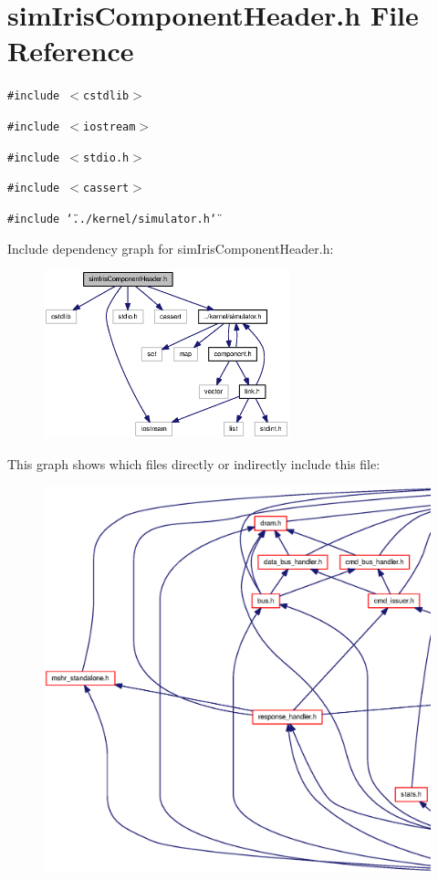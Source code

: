 \section{simIrisComponentHeader.h File Reference}
\label{simIrisComponentHeader_8h}
{\tt \#include $<$cstdlib$>$}\par
{\tt \#include $<$iostream$>$}\par
{\tt \#include $<$stdio.h$>$}\par
{\tt \#include $<$cassert$>$}\par
{\tt \#include \char`\"{}../kernel/simulator.h\char`\"{}}\par


Include dependency graph for simIrisComponentHeader.h:\nopagebreak
\begin{figure}[H]
\begin{center}
\leavevmode
\includegraphics[width=202pt]{simIrisComponentHeader_8h__incl}
\end{center}
\end{figure}


This graph shows which files directly or indirectly include this file:\nopagebreak
\begin{figure}[H]
\begin{center}
\leavevmode
\includegraphics[width=420pt]{simIrisComponentHeader_8h__dep__incl}
\end{center}
\end{figure}
